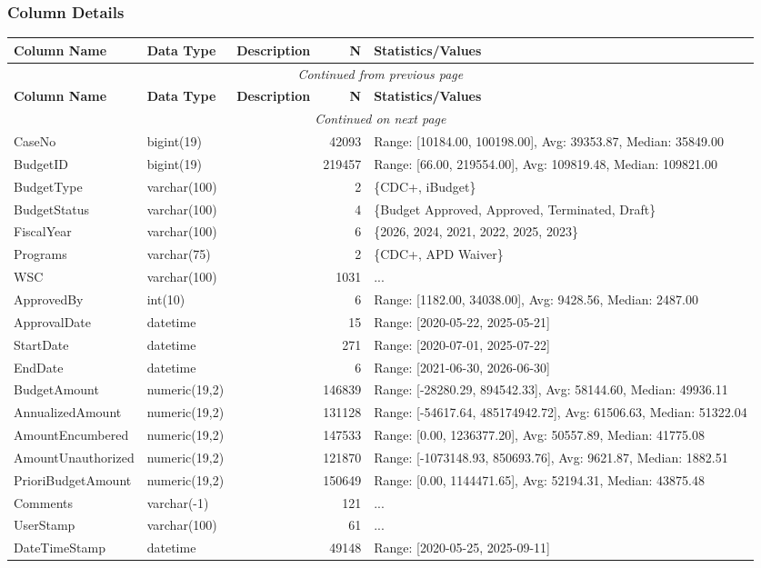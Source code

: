 \begin{landscape}
\subsubsection{Column Details}
\begin{longtable}{|l|l|l|r|p{6cm}|}
\hline
\textbf{Column Name} & \textbf{Data Type} & \textbf{Description} & \textbf{N} & \textbf{Statistics/Values} \\
\hline
\endfirsthead
\multicolumn{5}{c}{\textit{Continued from previous page}} \\
\hline
\textbf{Column Name} & \textbf{Data Type} & \textbf{Description} & \textbf{N} & \textbf{Statistics/Values} \\
\hline
\endhead
\hline
\multicolumn{5}{c}{\textit{Continued on next page}} \\
\endfoot
\hline
\endlastfoot
CaseNo & bigint(19) &  & 42093 & Range: [10184.00, 100198.00], Avg: 39353.87, Median: 35849.00 \\
\hline
BudgetID & bigint(19) &  & 219457 & Range: [66.00, 219554.00], Avg: 109819.48, Median: 109821.00 \\
\hline
BudgetType & varchar(100) &  & 2 & \{CDC+, iBudget\} \\
\hline
BudgetStatus & varchar(100) &  & 4 & \{Budget Approved, Approved, Terminated, Draft\} \\
\hline
FiscalYear & varchar(100) &  & 6 & \{2026, 2024, 2021, 2022, 2025, 2023\} \\
\hline
Programs & varchar(75) &  & 2 & \{CDC+, APD Waiver\} \\
\hline
WSC & varchar(100) &  & 1031 & ... \\
\hline
ApprovedBy & int(10) &  & 6 & Range: [1182.00, 34038.00], Avg: 9428.56, Median: 2487.00 \\
\hline
ApprovalDate & datetime &  & 15 & Range: [2020-05-22, 2025-05-21] \\
\hline
StartDate & datetime &  & 271 & Range: [2020-07-01, 2025-07-22] \\
\hline
EndDate & datetime &  & 6 & Range: [2021-06-30, 2026-06-30] \\
\hline
BudgetAmount & numeric(19,2) &  & 146839 & Range: [-28280.29, 894542.33], Avg: 58144.60, Median: 49936.11 \\
\hline
AnnualizedAmount & numeric(19,2) &  & 131128 & Range: [-54617.64, 485174942.72], Avg: 61506.63, Median: 51322.04 \\
\hline
AmountEncumbered & numeric(19,2) &  & 147533 & Range: [0.00, 1236377.20], Avg: 50557.89, Median: 41775.08 \\
\hline
AmountUnauthorized & numeric(19,2) &  & 121870 & Range: [-1073148.93, 850693.76], Avg: 9621.87, Median: 1882.51 \\
\hline
PrioriBudgetAmount & numeric(19,2) &  & 150649 & Range: [0.00, 1144471.65], Avg: 52194.31, Median: 43875.48 \\
\hline
Comments & varchar(-1) &  & 121 & ... \\
\hline
UserStamp & varchar(100) &  & 61 & ... \\
\hline
DateTimeStamp & datetime &  & 49148 & Range: [2020-05-25, 2025-09-11] \\
\hline
\end{longtable}


\end{landscape}
